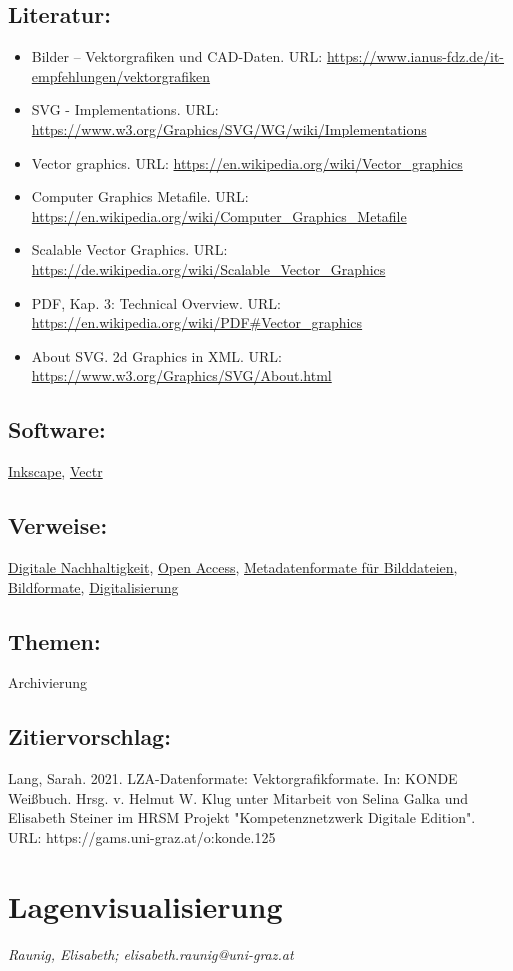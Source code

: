 \documentclass{article}
\begin{document}
        \subsection*{Literatur:}\begin{itemize}\item Bilder – Vektorgrafiken und CAD-Daten. URL: \url{https://www.ianus-fdz.de/it-empfehlungen/vektorgrafiken}\item SVG - Implementations. URL: \url{https://www.w3.org/Graphics/SVG/WG/wiki/Implementations}\item Vector graphics. URL: \url{https://en.wikipedia.org/wiki/Vector_graphics}\item Computer Graphics Metafile. URL: \url{https://en.wikipedia.org/wiki/Computer_Graphics_Metafile}\item Scalable Vector Graphics. URL: \url{https://de.wikipedia.org/wiki/Scalable_Vector_Graphics}\item PDF, Kap. 3: Technical Overview. URL: \url{https://en.wikipedia.org/wiki/PDF#Vector_graphics}\item About SVG. 2d Graphics in XML. URL: \url{https://www.w3.org/Graphics/SVG/About.html}\end{itemize}\subsection*{Software:}\href{https://inkscape.org/en/}{Inkscape}, \href{https://vectr.com/}{Vectr}\subsection*{Verweise:}\href{https://gams.uni-graz.at/o:konde.6}{Digitale Nachhaltigkeit}, \href{https://gams.uni-graz.at/o:konde.152}{Open Access}, \href{https://gams.uni-graz.at/o:konde.124}{Metadatenformate für Bilddateien}, \href{https://gams.uni-graz.at/o:konde.122}{Bildformate}, \href{https://gams.uni-graz.at/o:konde.60}{Digitalisierung}\subsection*{Themen:}Archivierung\subsection*{Zitiervorschlag:}Lang, Sarah. 2021. LZA-Datenformate: Vektorgrafikformate. In: KONDE Weißbuch. Hrsg. v. Helmut W. Klug unter Mitarbeit von Selina Galka und Elisabeth Steiner im HRSM Projekt "Kompetenznetzwerk Digitale Edition". URL: https://gams.uni-graz.at/o:konde.125\newpage\section*{Lagenvisualisierung} \emph{Raunig, Elisabeth; elisabeth.raunig@uni-graz.at }\\
        
\end{document}
